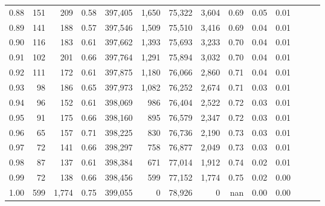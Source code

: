\begin{tabular}{rrrrrrrrrrrrrr}
0.88 &     151 &    209 &  0.58 &  397,405 &    1,650 &  75,322 &   3,604 &  0.69 &  0.05 &      0.01 \\
0.89 &     141 &    188 &  0.57 &  397,546 &    1,509 &  75,510 &   3,416 &  0.69 &  0.04 &      0.01 \\
0.90 &     116 &    183 &  0.61 &  397,662 &    1,393 &  75,693 &   3,233 &  0.70 &  0.04 &      0.01 \\
0.91 &     102 &    201 &  0.66 &  397,764 &    1,291 &  75,894 &   3,032 &  0.70 &  0.04 &      0.01 \\
0.92 &     111 &    172 &  0.61 &  397,875 &    1,180 &  76,066 &   2,860 &  0.71 &  0.04 &      0.01 \\
0.93 &      98 &    186 &  0.65 &  397,973 &    1,082 &  76,252 &   2,674 &  0.71 &  0.03 &      0.01 \\
0.94 &      96 &    152 &  0.61 &  398,069 &      986 &  76,404 &   2,522 &  0.72 &  0.03 &      0.01 \\
0.95 &      91 &    175 &  0.66 &  398,160 &      895 &  76,579 &   2,347 &  0.72 &  0.03 &      0.01 \\
0.96 &      65 &    157 &  0.71 &  398,225 &      830 &  76,736 &   2,190 &  0.73 &  0.03 &      0.01 \\
0.97 &      72 &    141 &  0.66 &  398,297 &      758 &  76,877 &   2,049 &  0.73 &  0.03 &      0.01 \\
0.98 &      87 &    137 &  0.61 &  398,384 &      671 &  77,014 &   1,912 &  0.74 &  0.02 &      0.01 \\
0.99 &      72 &    138 &  0.66 &  398,456 &      599 &  77,152 &   1,774 &  0.75 &  0.02 &      0.00 \\
1.00 &     599 &  1,774 &  0.75 &  399,055 &        0 &  78,926 &       0 &   nan &  0.00 &      0.00 \\
\bottomrule
\end{tabular}
